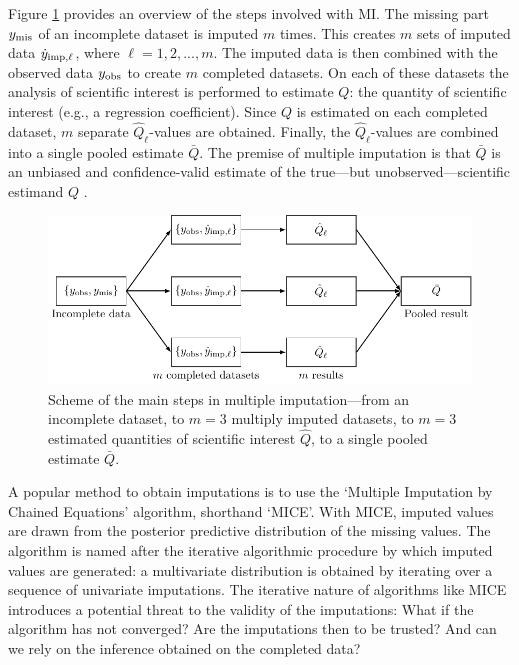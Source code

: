 \documentclass[Royal,times,sageh]{sagej}
\begin{document}
Figure \ref{fig:diagram} provides an overview of the steps involved with MI. The missing part \(y_{\rm mis}\) of an incomplete dataset is imputed \(m\) times. This creates \(m\) sets of imputed data \(\dot y_{\rm imp, \ell}\), where \(\ell = 1, 2, ..., m\). The imputed data is then combined with the observed data \(y_{\rm obs}\) to create \(m\) completed datasets. On each of these datasets the analysis of scientific interest is performed to estimate \(Q\): the quantity of scientific interest (e.g., a regression coefficient). Since \(Q\) is estimated on each completed dataset, \(m\) separate \(\hat{Q}_\ell\)-values are obtained. Finally, the \(\hat{Q}_\ell\)-values are combined into a single pooled estimate \(\bar{Q}\). The premise of multiple imputation is that \(\bar{Q}\) is an unbiased and confidence-valid estimate of the true---but unobserved---scientific estimand \(Q\) \citep{rubin96}.

\begin{figure}

{\centering \includegraphics[width=\linewidth]{../Figures/DiagramMI} 

}

\caption{Scheme of the main steps in multiple imputation---from an incomplete dataset, to $m=3$ multiply imputed datasets, to $m=3$ estimated quantities of scientific interest $\hat{Q}$, to a single pooled estimate $\bar{Q}$.}\label{fig:diagram}
\end{figure}

A popular method to obtain imputations is to use the `Multiple Imputation by Chained Equations' algorithm, shorthand `MICE'\citep{mice}. With MICE, imputed values are drawn from the posterior predictive distribution of the missing values. The algorithm is named after the iterative algorithmic procedure by which imputed values are generated: a multivariate distribution is obtained by iterating over a sequence of univariate imputations. The iterative nature of algorithms like MICE introduces a potential threat to the validity of the imputations: What if the algorithm has not converged? Are the imputations then to be trusted? And can we rely on the inference obtained on the completed data?
\end{document}
